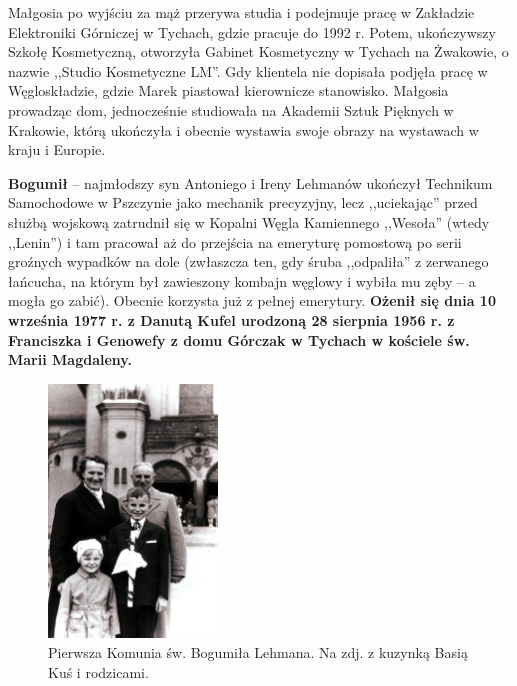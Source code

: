 Małgosia po wyjściu za mąż przerywa studia i podejmuje pracę w Zakładzie Elektroniki Górniczej w Tychach, gdzie pracuje do 1992 r. Potem, ukończywszy Szkołę Kosmetyczną, otworzyła Gabinet Kosmetyczny w Tychach na Żwakowie, o nazwie ,,Studio Kosmetyczne LM''. Gdy klientela nie dopisała podjęła pracę w Węgloskładzie, gdzie Marek piastował kierownicze stanowisko. Małgosia prowadząc dom,  jednocześnie studiowała na Akademii Sztuk Pięknych w Krakowie, którą ukończyła i obecnie wystawia swoje obrazy na wystawach w kraju i Europie.

\textbf{Bogumił} -- najmłodszy syn Antoniego i Ireny Lehmanów ukończył Technikum Samochodowe w Pszczynie jako mechanik precyzyjny, lecz ,,uciekając'' przed służbą wojskową zatrudnił się w Kopalni Węgla Kamiennego ,,Wesoła'' (wtedy ,,Lenin'') i tam pracował aż do przejścia na emeryturę pomostową po serii groźnych wypadków na dole (zwłaszcza ten, gdy śruba ,,odpaliła'' z zerwanego łańcucha, na którym był zawieszony kombajn węglowy i wybiła mu zęby -- a mogła go zabić). Obecnie korzysta już z pełnej emerytury. \textbf{Ożenił się dnia 10 września 1977 r. z Danutą Kufel urodzoną 28 sierpnia 1956 r. z Franciszka i Genowefy z domu Górczak w Tychach w kościele św. Marii Magdaleny.}

\begin{figure}[!h]
\begin{center}
\includegraphics[width=0.4\textwidth]{photo/bogumil_lehman_komunia.jpg}
\caption[Pierwsza Komunia św. Bogumiła Lehmana]{Pierwsza Komunia św. Bogumiła Lehmana. Na zdj. z kuzynką Basią Kuś i rodzicami.}
\end{center}
\end{figure}

